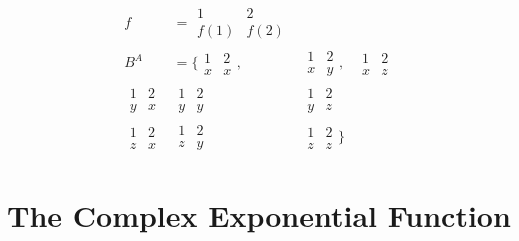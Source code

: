 \begin{example}
    \begin{align*}
        f & = \begin{matrix}
                  1    & 2    \\
                  f(1) & f(2)
              \end{matrix} \\ B^A &= \{ \begin{matrix}
            1 & 2 \\
            x & x
        \end{matrix}, & \begin{matrix}
            1 & 2 \\
            x & y
        \end{matrix}, & \begin{matrix}
            1 & 2 \\
            x & z
        \end{matrix} \\ \begin{matrix}
            1 & 2 \\
            y & x
        \end{matrix} & \begin{matrix}
            1 & 2 \\
            y & y
        \end{matrix} & \begin{matrix}
            1 & 2 \\
            y & z
        \end{matrix} \\ \begin{matrix}
            1 & 2 \\
            z & x
        \end{matrix} & \begin{matrix}
            1 & 2 \\
            z & y
        \end{matrix} & \begin{matrix}
            1 & 2 \\
            z & z
        \end{matrix}\}
    \end{align*}
\end{example}

\section{The Complex Exponential Function}

